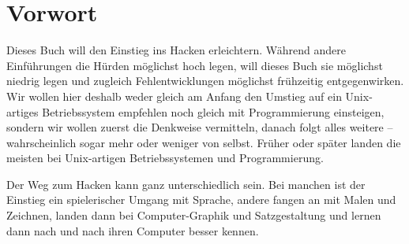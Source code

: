 
\chapter{Vorwort}

Dieses Buch will den Einstieg ins Hacken erleichtern. Während andere Einführungen die Hürden möglichst hoch legen, will dieses Buch sie möglichst niedrig legen und zugleich Fehlentwicklungen möglichst frühzeitig entgegenwirken. Wir wollen hier deshalb weder gleich am Anfang den Umstieg auf ein Unix-artiges Betriebssystem empfehlen noch gleich mit Programmierung einsteigen, sondern wir wollen zuerst die Denkweise vermitteln, danach folgt alles weitere – wahrscheinlich sogar mehr oder weniger von selbst. Früher oder später landen die meisten bei Unix-artigen Betriebssystemen und Programmierung.

Der Weg zum Hacken kann ganz unterschiedlich sein. Bei manchen ist der Einstieg ein spielerischer Umgang mit Sprache, andere fangen an mit Malen und Zeichnen, landen dann bei Computer-Graphik und Satzgestaltung und lernen dann nach und nach ihren Computer besser kennen.  